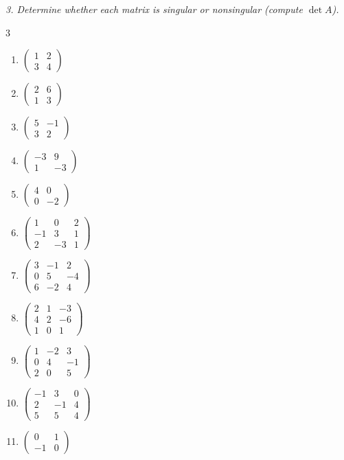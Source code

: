 \emph{3. Determine whether each matrix is singular or nonsingular (compute $\det A$).}
\bigskip
\begin{multicols}{3}\raggedright
\begin{enumerate}[label=\arabic*.,  leftmargin=*]
\item $\begin{pmatrix}1&2\\3&4\end{pmatrix}$
\item $\begin{pmatrix}2&6\\1&3\end{pmatrix}$
\item $\begin{pmatrix}5&-1\\3&2\end{pmatrix}$
\item $\begin{pmatrix}-3&9\\1&-3\end{pmatrix}$
\item $\begin{pmatrix}4&0\\0&-2\end{pmatrix}$
\item $\begin{pmatrix}1&0&2\\-1&3&1\\2&-3&1\end{pmatrix}$
\item $\begin{pmatrix}3&-1&2\\0&5&-4\\6&-2&4\end{pmatrix}$
\item $\begin{pmatrix}2&1&-3\\4&2&-6\\1&0&1\end{pmatrix}$
\item $\begin{pmatrix}1&-2&3\\0&4&-1\\2&0&5\end{pmatrix}$
\item $\begin{pmatrix}-1&3&0\\2&-1&4\\5&5&4\end{pmatrix}$
\item $\begin{pmatrix}0&1\\-1&0\end{pmatrix}$

\end{enumerate}
\end{multicols}
